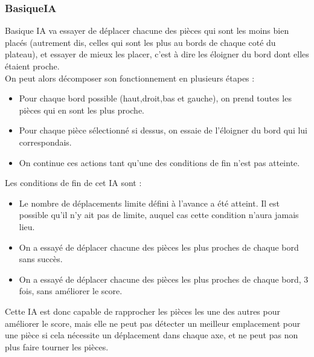 \documentclass[a4paper,12pt]{article} %
\begin{document}
\subsubsection{BasiqueIA}
Basique IA va essayer de déplacer chacune des pièces qui sont les moins bien placés (autrement dis, celles qui sont les plus au bords de chaque coté du plateau), et essayer de mieux les placer, c'est à dire les éloigner du bord dont elles étaient proche. \\
On peut alors décomposer son fonctionnement en plusieurs étapes :
\begin{itemize}
    \item Pour chaque bord possible (haut,droit,bas et gauche), on prend toutes les pièces qui en sont les plus proche.
    \item Pour chaque pièce sélectionné si dessus, on essaie de l'éloigner du bord qui lui correspondais.
    \item On continue ces actions tant qu'une des conditions de fin n'est pas atteinte. 
\end{itemize}
 Les conditions de fin de cet IA sont :
\begin{itemize}
    \item Le nombre de déplacements limite défini à l'avance a été atteint. Il est possible qu'il n'y ait pas de limite, auquel cas cette condition n'aura jamais lieu.
    \item On a essayé de déplacer chacune des pièces les plus proches de chaque bord sans succès.
    \item On a essayé de déplacer chacune des pièces les plus proches de chaque bord, 3 fois, sans améliorer le score.
\end{itemize}

Cette IA est donc capable de rapprocher les pièces les une des autres pour améliorer le score, mais elle ne peut pas détecter un meilleur emplacement pour une pièce si cela nécessite un déplacement dans chaque axe, et ne peut pas non plus faire tourner les pièces.
\end{document}
